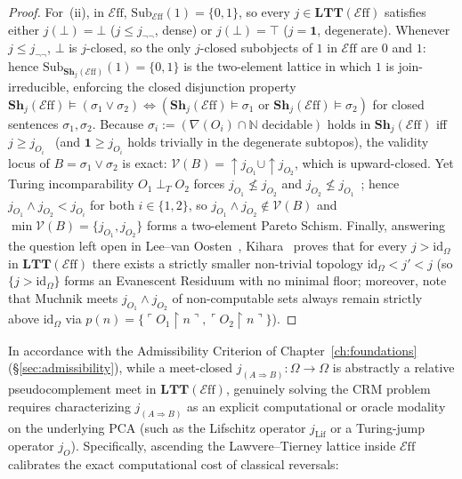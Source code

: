 \documentclass[10pt,twoside,openright]{book}
\theoremstyle{crmplain}
\theoremstyle{crmdef}
\theoremstyle{crmremark}
\newcommand{\Eff}{\mathcal{E}\mathrm{ff}}
\begin{document}
\begin{proof}
For~(ii), in $\Eff$, $\mathrm{Sub}_{\Eff}(1) = \{0, 1\}$, so every $j \in \mathbf{LTT}(\Eff)$ satisfies either $j(\bot) = \bot$ ($j \le j_{\neg\neg}$, dense) or $j(\bot) = \top$ ($j = \mathbf{1}$, degenerate). Whenever $j \le j_{\neg\neg}$, $\bot$ is $j$-closed, so the only $j$-closed subobjects of $1$ in $\Eff$ are $0$ and $1$: hence $\mathrm{Sub}_{\mathbf{Sh}_j(\Eff)}(1) = \{0, 1\}$ is the two-element lattice in which $1$ is join-irreducible, enforcing the closed disjunction property $\mathbf{Sh}_j(\Eff) \models (\sigma_1 \lor \sigma_2) \iff (\mathbf{Sh}_j(\Eff) \models \sigma_1 \text{ or } \mathbf{Sh}_j(\Eff) \models \sigma_2)$ for closed sentences $\sigma_1, \sigma_2$. Because $\sigma_i := (\nabla(O_i)\cap\mathbb{N}\text{ decidable})$ holds in $\mathbf{Sh}_j(\Eff)$ iff $j \ge j_{O_i}$~\cite{LeeVanOosten13} (and $\mathbf{1} \ge j_{O_i}$ holds trivially in the degenerate subtopos), the validity locus of $B = \sigma_1 \lor \sigma_2$ is exact: $\mathcal{V}(B) = {\uparrow} j_{O_1} \cup {\uparrow} j_{O_2}$, which is upward-closed. Yet Turing incomparability $O_1 \perp_T O_2$ forces $j_{O_1} \not\le j_{O_2}$ and $j_{O_2} \not\le j_{O_1}$~\cite{LeeVanOosten13}; hence $j_{O_1} \wedge j_{O_2} < j_{O_i}$ for both $i \in \{1, 2\}$, so $j_{O_1} \wedge j_{O_2} \notin \mathcal{V}(B)$ and $\min \mathcal{V}(B) = \{j_{O_1}, j_{O_2}\}$ forms a two-element Pareto Schism. Finally, answering the question left open in Lee--van Oosten~\cite{LeeVanOosten13}, Kihara~\cite[\S 4]{Kihara23} proves that for every $j > \mathrm{id}_\Omega$ in $\mathbf{LTT}(\Eff)$ there exists a strictly smaller non-trivial topology $\mathrm{id}_\Omega < j' < j$ (so $\{j > \mathrm{id}_\Omega\}$ forms an Evanescent Residuum with no minimal floor; moreover, note that Muchnik meets $j_{O_1} \wedge j_{O_2}$ of non-computable sets always remain strictly above $\mathrm{id}_\Omega$ via $p(n) = \{\ulcorner O_1\!\upharpoonright\! n\urcorner, \ulcorner O_2\!\upharpoonright\! n\urcorner\}$).
\end{proof}

In accordance with the Admissibility Criterion of Chapter~\ref{ch:foundations} (\S\ref{sec:admissibility}), while a meet-closed $j_{(A \Rightarrow B)}: \Omega \to \Omega$ is abstractly a relative pseudocomplement meet in $\mathbf{LTT}(\Eff)$, genuinely solving the $\mathrm{CRM}$ problem requires characterizing $j_{(A \Rightarrow B)}$ as an explicit computational or oracle modality on the underlying PCA (such as the Lifschitz operator $j_{\mathrm{Lif}}$ or a Turing-jump operator $j_O$). Specifically, ascending the Lawvere--Tierney lattice inside $\Eff$ calibrates the exact computational cost of classical reversals:
\end{document}
